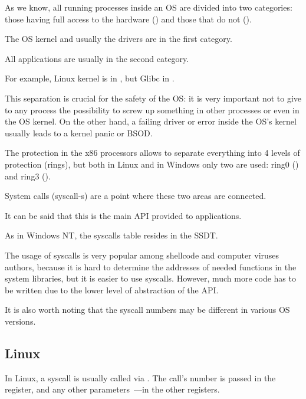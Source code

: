 
\label{syscalls}

As we know, all running processes inside an \ac{OS} are divided into two categories:
those having full access to the hardware () 
and those that do not ().

The \ac{OS} kernel and usually the drivers are in the first category.

All applications are usually in the second category.

For example, Linux kernel is in , but Glibc in .

This separation is crucial for the safety of the \ac{OS}: it is very important not to give to any process the possibility to screw up
something in other processes or even in the \ac{OS} kernel.
On the other hand, a failing driver or error inside the \ac{OS}'s kernel usually leads to a kernel panic or \ac{BSOD}.

The protection in the x86 processors allows to separate everything into 4 levels of protection (rings), but both in Linux
and in Windows only two are used: ring0 () and ring3 ().

System calls (syscall-s)
are a point where these two areas are connected.

It can be said that this is the main \ac{API} provided to applications.

As in \gls{Windows NT}, the syscalls table resides in the \ac{SSDT}.


The usage of syscalls is very popular among shellcode and computer viruses authors, 
because it is hard to determine the addresses of
needed functions in the system libraries, but it is easier to use syscalls. However, much more code has to be
written due to the lower level of abstraction of the \ac{API}.

It is also worth noting that the syscall numbers may be different in various OS versions.

\subsection{Linux}
\label{linux_syscall}

In Linux, a syscall is usually called via .
The call's number is passed in the \EAX register, and any other parameters~---in the other registers.


